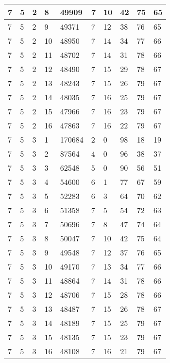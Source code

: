 \begin{table}[!ht]
\begin{tabular}{|l|l|l|l|l|l|l|l|l|l|}
        7 & 5 & 2 & 8 & 49909 & 7 & 10 & 42 & 75 & 65 \\ \hline
        7 & 5 & 2 & 9 & 49371 & 7 & 12 & 38 & 76 & 65 \\ \hline
        7 & 5 & 2 & 10 & 48950 & 7 & 14 & 34 & 77 & 66 \\ \hline
        7 & 5 & 2 & 11 & 48702 & 7 & 14 & 31 & 78 & 66 \\ \hline
        7 & 5 & 2 & 12 & 48490 & 7 & 15 & 29 & 78 & 67 \\ \hline
        7 & 5 & 2 & 13 & 48243 & 7 & 15 & 26 & 79 & 67 \\ \hline
        7 & 5 & 2 & 14 & 48035 & 7 & 16 & 25 & 79 & 67 \\ \hline
        7 & 5 & 2 & 15 & 47966 & 7 & 16 & 23 & 79 & 67 \\ \hline
        7 & 5 & 2 & 16 & 47863 & 7 & 16 & 22 & 79 & 67 \\ \hline
        7 & 5 & 3 & 1 & 170684 & 2 & 0 & 98 & 18 & 19 \\ \hline
        7 & 5 & 3 & 2 & 87564 & 4 & 0 & 96 & 38 & 37 \\ \hline
        7 & 5 & 3 & 3 & 62548 & 5 & 0 & 90 & 56 & 51 \\ \hline
        7 & 5 & 3 & 4 & 54600 & 6 & 1 & 77 & 67 & 59 \\ \hline
        7 & 5 & 3 & 5 & 52283 & 6 & 3 & 64 & 70 & 62 \\ \hline
        7 & 5 & 3 & 6 & 51358 & 7 & 5 & 54 & 72 & 63 \\ \hline
        7 & 5 & 3 & 7 & 50696 & 7 & 8 & 47 & 74 & 64 \\ \hline
        7 & 5 & 3 & 8 & 50047 & 7 & 10 & 42 & 75 & 64 \\ \hline
        7 & 5 & 3 & 9 & 49548 & 7 & 12 & 37 & 76 & 65 \\ \hline
        7 & 5 & 3 & 10 & 49170 & 7 & 13 & 34 & 77 & 66 \\ \hline
        7 & 5 & 3 & 11 & 48864 & 7 & 14 & 31 & 78 & 66 \\ \hline
        7 & 5 & 3 & 12 & 48706 & 7 & 15 & 28 & 78 & 66 \\ \hline
        7 & 5 & 3 & 13 & 48487 & 7 & 15 & 26 & 78 & 67 \\ \hline
        7 & 5 & 3 & 14 & 48189 & 7 & 15 & 25 & 79 & 67 \\ \hline
        7 & 5 & 3 & 15 & 48135 & 7 & 15 & 23 & 79 & 67 \\ \hline
        7 & 5 & 3 & 16 & 48108 & 7 & 16 & 21 & 79 & 67 \\ \hline

\end{tabular}
\end{table}

